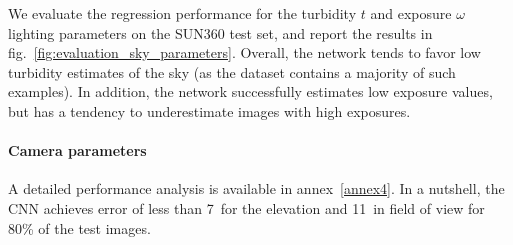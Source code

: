 
We evaluate the regression performance for the turbidity $t$ and exposure $\omega$ lighting parameters on the SUN360 test set, and report the results in fig.~\ref{fig:evaluation_sky_parameters}. Overall, the network tends to favor low turbidity estimates of the sky (as the dataset contains a majority of such examples). In addition, the network successfully estimates low exposure values, but has a tendency to underestimate images with high exposures.%
\vspace{-1.5em}
\paragraph{Camera parameters}

A detailed performance analysis is available in annex~\ref{annex4}. In a nutshell, the CNN achieves error of less than 7\degree ~for the elevation and 11\degree ~in field of view for 80\% of the test images. 



